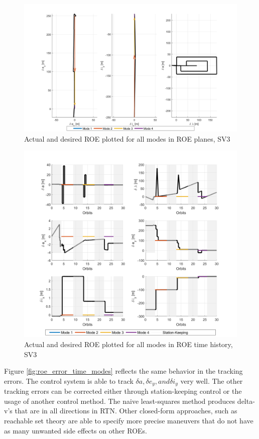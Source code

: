 \begin{figure}[H]
    \centering
    \includegraphics[width=0.75\linewidth]{sim/figures/PS5/ROE_planes_modes_SV3.png}
    \caption{Actual and desired ROE plotted for all modes in ROE planes, SV3}
    \label{fig:roe_planes_modes}
\end{figure}
\begin{figure}[H]
    \centering
    \includegraphics[width=0.75\linewidth]{sim/figures/PS5/ROE_over_time_modes_SV3.png}
    \caption{Actual and desired ROE plotted for all modes in ROE time history, SV3}
    \label{fig:roe_time_modes}
\end{figure}

Figure \ref{fig:roe_error_time_modes} reflects the same behavior in the tracking errors. The control system is able to track $\delta a, \delta e_y, and \delta i_y$ very well. The other tracking errors can be corrected either through station-keeping control or the usage of another control method. The naive least-squares method produces delta-v's that are in all directions in RTN. Other closed-form approaches, such as reachable set theory are able to specify more precise maneuvers that do not have as many unwanted side effects on other ROEs. 

